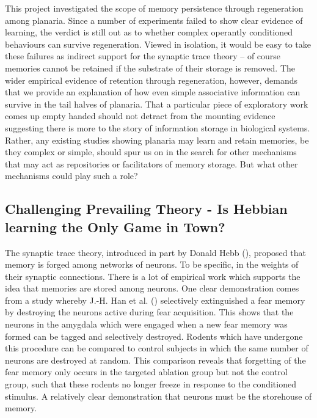 \documentclass[
  jou,
  floatsintext,
  longtable,
  nolmodern,
  notxfonts,
  notimes,
  donotrepeattitle,
  colorlinks=true,linkcolor=blue,citecolor=blue,urlcolor=blue]{apa7}
\begin{document}
This project investigated the scope of memory persistence through
regeneration among planaria. Since a number of experiments failed to
show clear evidence of learning, the verdict is still out as to whether
complex operantly conditioned behaviours can survive regeneration.
Viewed in isolation, it would be easy to take these failures as indirect
support for the synaptic trace theory -- of course memories cannot be
retained if the substrate of their storage is removed. The wider
empirical evidence of retention through regeneration, however, demands
that we provide an explanation of how even simple associative
information can survive in the tail halves of planaria. That a
particular piece of exploratory work comes up empty handed should not
detract from the mounting evidence suggesting there is more to the story
of information storage in biological systems. Rather, any existing
studies showing planaria may learn and retain memories, be they complex
or simple, should spur us on in the search for other mechanisms that may
act as repositories or facilitators of memory storage. But what other
mechanisms could play such a role?

\subsection{Challenging Prevailing Theory - Is Hebbian learning the Only
Game in Town?}\label{sec-challenging-prevailing-theory}

The synaptic trace theory, introduced in part by Donald Hebb
(), proposed that
memory is forged among networks of neurons. To be specific, in the
weights of their synaptic connections. There is a lot of empirical work
which supports the idea that memories are stored among neurons. One
clear demonstration comes from a study whereby J.-H. Han et al.
() selectively extinguished a
fear memory by destroying the neurons active during fear acquisition.
This shows that the neurons in the amygdala which were engaged when a
new fear memory was formed can be tagged and selectively destroyed.
Rodents which have undergone this procedure can be compared to control
subjects in which the same number of neurons are destroyed at random.
This comparison reveals that forgetting of the fear memory only occurs
in the targeted ablation group but not the control group, such that
these rodents no longer freeze in response to the conditioned stimulus.
A relatively clear demonstration that neurons must be the storehouse of
memory.
\end{document}
